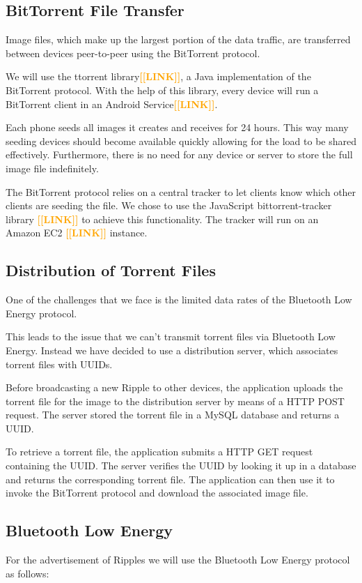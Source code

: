 \documentclass{report}
\newcommand{\todo}[1]{\textsf{\textbf{\textcolor{orange}{[[#1]]}}}}
\begin{document}
\subsection{BitTorrent File Transfer}
Image files, which make up the largest portion of the data traffic, are transferred between devices peer-to-peer using the BitTorrent protocol.

We will use the ttorrent library\todo{LINK}, a Java implementation of the BitTorrent protocol. With the help of this library, every device will run a BitTorrent client in an Android Service\todo{LINK}.

Each phone seeds all images it creates and receives for 24 hours. This way many seeding devices should become available quickly allowing for the load to be shared effectively. Furthermore, there is no need for any device or server to store the full image file indefinitely.

The BitTorrent protocol relies on a central tracker to let clients know which other clients are seeding the file. We chose to use the JavaScript bittorrent-tracker library \todo{LINK} to achieve this functionality. The tracker will run on an Amazon EC2 \todo{LINK} instance.

\subsection{Distribution of Torrent Files}
One of the challenges that we face is the limited data rates of the Bluetooth Low Energy protocol.

This leads to the issue that we can't transmit torrent files via Bluetooth Low Energy. Instead we have decided to use a distribution server, which associates torrent files with UUIDs.

Before broadcasting a new Ripple to other devices, the application uploads the torrent file for the image to the distribution server by means of a HTTP POST request. The server stored the torrent file in a MySQL database and returns a UUID. 

To retrieve a torrent file, the application submits a HTTP GET request containing the UUID. The server verifies the UUID by looking it up in a database and returns the corresponding torrent file. The application can then use it to invoke the BitTorrent protocol and download the associated image file.

\subsection{Bluetooth Low Energy}
For the advertisement of Ripples we will use the Bluetooth Low Energy protocol as follows:
\end{document}

